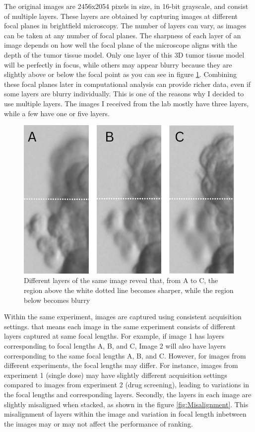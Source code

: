   The original images are 2456x2054 pixels in size, in 16-bit grayscale, and consist of multiple layers. These layers are obtained by capturing images
   at different focal planes in brightfield microscopy. The number of layers can vary, as images can be taken at any number of focal planes. The sharpness 
   of each layer of an image depends on how well the focal plane of the microscope aligns with the depth of the tumor tissue model. Only one layer of this 3D tumor tissue model will 
   be perfectly in focus, while others may appear blurry because they are slightly above or below the focal point as you can see in figure \ref{fig:blur}. Combining these focal planes later in 
   computational analysis can provide richer data, even if some layers are blurry individually. This is one of the reasons why I decided to use multiple
    layers. The images I received from the lab mostly have three layers, while a few have one or five layers.

    \begin{figure}[H]
      \centering
      \includegraphics[scale=0.4]{figures/blur.png} 
      \caption{Different layers of the same image reveal that, from A to C, the region above the white dotted line becomes sharper, while the region below becomes blurry }
      \label{fig:blur}
    \end{figure}

    Within the same experiment, images are 
    captured using consistent acquisition settings. that means each image in the same experiment consists of different layers captured at same focal lengths. For example, if image 1 has layers corresponding to focal
 lengths A, B, and C, Image 2 will also have layers corresponding to the same focal lengths A, B, and C.  However, for images from different experiments, the focal lengths may differ. For instance, images from 
 experiment 1 (single dose) may have slightly different acquisition settings compared to images from experiment 2 (drug screening), leading to variations 
 in the focal lengths and corresponding layers. 
 Secondly, the layers in each image are slightly misaligned when stacked, as shown in the figure  \ref{fig:Misalignment}. This misalignment of layers within the image and variation in focal length inbetween the images may or may not affect the performance of ranking.

